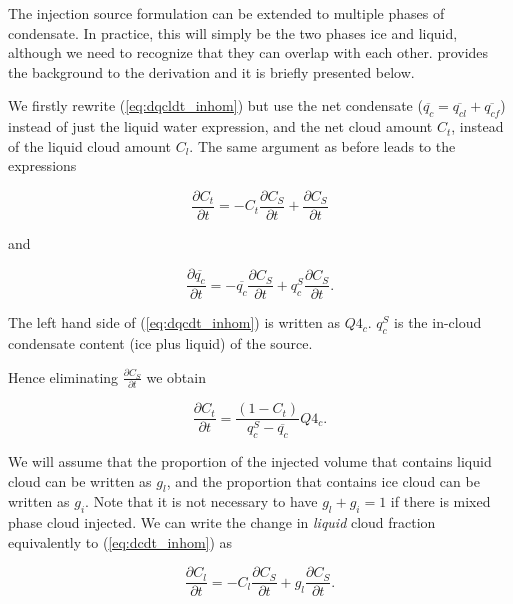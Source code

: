 \documentclass{UMDP_article}
\begin{document}
The injection source formulation can be extended to multiple
phases of condensate. In practice, this will simply be the
two phases ice and liquid, although we need to recognize that
they can overlap with each other. \cite{wilson2001} provides the
background to the derivation and it is briefly presented below.

We firstly rewrite (\ref{eq:dqcldt_inhom}) but use the net
condensate ($\overline{q_c} = \overline{q_{cl}} + \overline{q_{cf}}$) instead of just the
liquid water expression, and the net cloud amount $C_t$, instead
of the liquid cloud amount $C_l$. The same argument as before leads
to the expressions

\begin{equation}
\frac{\partial{C_t}}{\partial{t}} =
- C_t \frac{\partial{C_S}}{\partial{t}} + \frac{\partial{C_S}}{\partial{t}}
\label{eq:dctdt_inhom}
\end{equation}

and

\begin{equation}
\frac{\partial{\overline{q_{c}}}}{\partial{t}} =
- \overline{q_{c}} \frac{\partial{C_S}}{\partial{t}}
+ q_{c}^S \frac{\partial{C_S}}{\partial{t}} .
\label{eq:dqcdt_inhom}
\end{equation}

The left hand side of (\ref{eq:dqcdt_inhom}) is written as $Q4_c$.
$q_{c}^S$ is the in-cloud
condensate content (ice plus liquid) of the source.

Hence eliminating $\frac{\partial{C_S}}{\partial{t}}$ we obtain

\begin{equation}
\frac{\partial{C_t}}{\partial{t}} = \frac{(1-C_t)}{q_{c}^S -
\overline{q_{c}}} Q4_c .
\label{eq:dctdt_q4}
\end{equation}

We will assume that the proportion of the injected volume that
contains liquid cloud can be written as $g_l$, and the proportion
that contains ice cloud can be written as $g_i$. Note that it
is not necessary to have $g_l + g_i = 1$ if there is mixed
phase cloud injected. We can write the change in \textit{liquid} cloud
fraction equivalently to (\ref{eq:dcdt_inhom}) as

\begin{equation}
\frac{\partial{C_l}}{\partial{t}} =
- C_l \frac{\partial{C_S}}{\partial{t}} + g_l \frac{\partial{C_S}}{\partial{t}} .
\label{eq:dcldt_inhom}
\end{equation}
\end{document}
